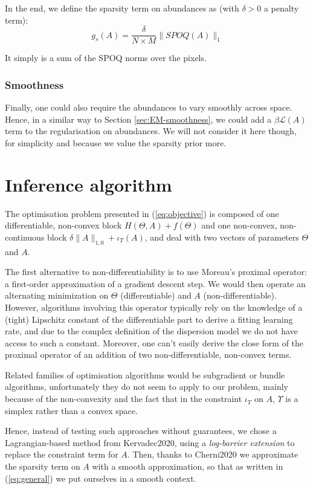 \documentclass{article}
\begin{document}
In the end, we define the sparsity term on abundances as (with $\delta > 0$ a penalty term):
\begin{equation}\label{eq:g_s}
  g_s(A) = \frac{\delta}{N \times M} \| SPOQ(A) \|_{1}
\end{equation}

It simply is a sum of the SPOQ norms over the pixels.

\subsubsection{Smoothness}
Finally, one could also require the abundances to vary smoothly across space. Hence, in a similar way to Section \ref{sec:EM-smoothness}, we could add a $\beta \mathcal{L}(A)$ term to the regularisation on abundances. We will not consider it here though, for simplicity and because we value the sparsity prior more.


\section{Inference algorithm}

The optimisation problem presented in (\ref{eq:objective}) is composed of one differentiable, non-convex block $H(\Theta, A) + f(\Theta)$ and one non-convex, non-continuous block $\delta\|A\|_{1,0} + \iota_\Upsilon (A)$, and deal with two vectors of parameters $\Theta$ and $A$.

The first alternative to non-differentiability is to use Moreau's proximal operator: a first-order approximation of a gradient descent step. We would then operate an alternating minimization on $\Theta$ (differentiable) and $A$ (non-differentiable). However, algorithms involving this operator typically rely on the knowledge of a (tight) Lipschitz constant of the differentiable part to derive a fitting learning rate, and due to the complex definition of the dispersion model we do not have access to such a constant. Moreover, one can't easily derive the close form of the proximal operator of an addition of two non-differentiable, non-convex terms.

Related families of optimisation algorithms would be subgradient or bundle algorithms, unfortunately they do not seem to apply to our problem, mainly because of the non-convexity and the fact that in the constraint $\iota_\Upsilon$ on $A$, $\Upsilon$ is a simplex rather than a convex space.

Hence, instead of testing such approaches without guarantees, we chose a Lagrangian-based method from Kervadec2020, using a \emph{log-barrier extension} to replace the constraint term for $A$. Then, thanks to Cherni2020 we approximate the sparsity term on $A$ with a smooth approximation, so that as written in (\ref{eq:general}) we put ourselves in a smooth context.
\end{document}
